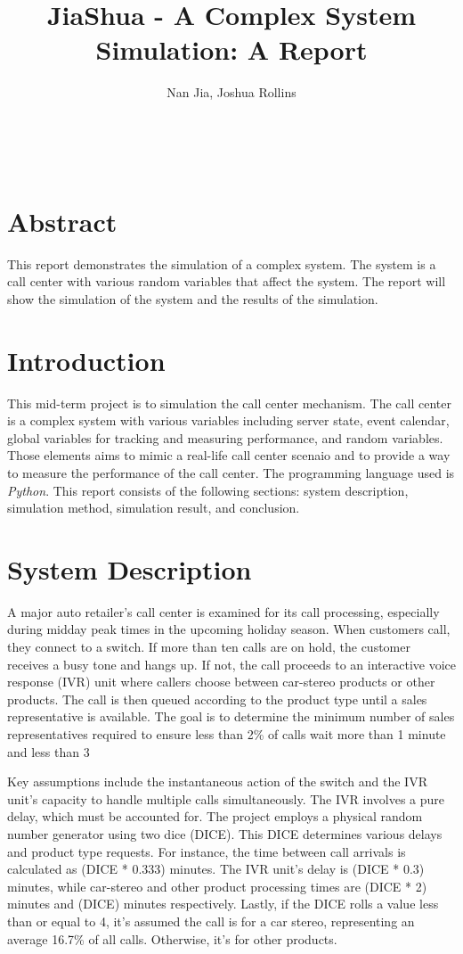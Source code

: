\documentclass{article}
\title{JiaShua - A Complex System Simulation: A Report}
\author{Nan Jia, Joshua Rollins}
\makeatletter
\renewcommand{\maketitle}{\bgroup\setlength{\parindent}{0pt}
\begin{flushleft}
  \textbf{\LARGE \@title} \\ %
  \vspace{0.5em}
  \@author
\end{flushleft}\egroup
}
\makeatother
\begin{document}
\maketitle
\section*{Abstract}
This report demonstrates the simulation of a complex system. The system is a call center with various random variables that affect the system. The report will show the simulation of the system and the results of the simulation.

\section{Introduction}
This mid-term project is to simulation the call center mechanism. The call center is a complex system with various variables including server state, event calendar, global variables for tracking and measuring performance, and random variables. Those elements aims to mimic a real-life call center scenaio and to provide a way to measure the performance of the call center. The programming language used is \emph{Python}. This report consists of the following sections: system description, simulation method, simulation result, and conclusion.

\section{System Description}
A major auto retailer's call center is examined for its call processing, especially during midday peak times in the upcoming holiday season. When customers call, they connect to a switch. If more than ten calls are on hold, the customer receives a busy tone and hangs up. If not, the call proceeds to an interactive voice response (IVR) unit where callers choose between car-stereo products or other products. The call is then queued according to the product type until a sales representative is available. The goal is to determine the minimum number of sales representatives required to ensure less than 2\% of calls wait more than 1 minute and less than 3%

Key assumptions include the instantaneous action of the switch and the IVR unit's capacity to handle multiple calls simultaneously. The IVR involves a pure delay, which must be accounted for. The project employs a physical random number generator using two dice (DICE). This DICE determines various delays and product type requests. For instance, the time between call arrivals is calculated as (DICE * 0.333) minutes. The IVR unit's delay is (DICE * 0.3) minutes, while car-stereo and other product processing times are (DICE * 2) minutes and (DICE) minutes respectively. Lastly, if the DICE rolls a value less than or equal to 4, it's assumed the call is for a car stereo, representing an average 16.7\% of all calls. Otherwise, it's for other products.
\end{document}

